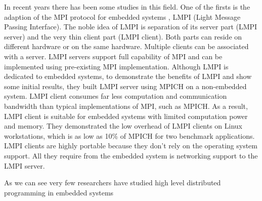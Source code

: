 In recent years there has been some studies in this field. One of the
firsts is the adaption of the MPI protocol for embedded systems , LMPI
\cite{Liu} (Light Message Passing Interface). The noble idea of LMPI is
separation of its server part (LMPI server) and the very thin client part (LMPI
client). Both parts can reside on different hardware or on the same hardware.
Multiple clients can be associated with a server. LMPI servers support full
capability of MPI and can be implemented using pre-existing MPI implementation.
Although LMPI is dedicated to embedded systems, to demonstrate the benefits of
LMPI and show some initial results, they built LMPI server using MPICH on a
non-embedded system. LMPI client consumes far less computation and
communication
bandwidth than typical implementations of MPI, such as MPICH. As a result, LMPI
client is suitable for embedded systems with limited computation power and
memory. They demonstrated the low overhead of LMPI clients on Linux
workstations, which is as low as 10\% of MPICH for two benchmark applications.
LMPI clients are highly portable because they don't rely on the operating
system
support. All they require from the embedded system is networking support to the
LMPI server.

As we can see very few researchers have studied high level distributed programming
in embedded systems

\newpage

\clearpage
